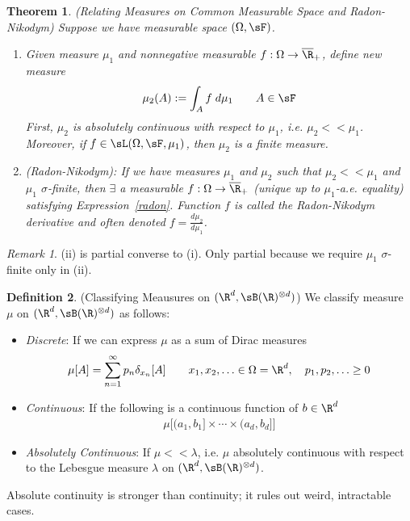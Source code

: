 \documentclass[12pt]{article}
\theoremstyle{plain}
\newtheorem{thm}{Theorem}[section]
\theoremstyle{definition}
\newtheorem{defn}[thm]{Definition}
\theoremstyle{remark}
\newtheorem*{rmk}{Remark}
\newcommand{\ra}{\rightarrow}
\newcommand{\ninf}{_{n=1}^\infty}
\begin{document}
\begin{thm}
\label{thm:radon}
\emph{(Relating Measures on Common Measurable Space and Radon-Nikodym)}
Suppose we have measurable space $(\Omega,\sF)$.
\begin{enumerate}[label=\emph{(\roman*)}]
  \item
    Given measure $\mu_1$ and nonnegative measurable
    $f:\Omega\ra \overline{\R}_+$, define new measure
    \begin{align}
      \mu_2(A) := \int_A f \; d\mu_1
      \qquad A\in\sF
      \label{radon}
    \end{align}
    First, $\mu_2$ is absolutely continuous with respect to
    $\mu_1$, i.e. $\mu_2 << \mu_1$.
    Moreover, if $f\in\sL(\Omega,\sF,\mu_1)$, then $\mu_2$ is a finite
    measure.
  \item \emph{(Radon-Nikodym)}:
    If we have measures $\mu_1$ and $\mu_2$ such that
    $\mu_2<<\mu_1$ and $\mu_1$ $\sigma$-finite,
    then $\exists$ a measurable $f:\Omega\ra \overline{\R}_+$
    (unique up to $\mu_1$-a.e. equality)
    satisfying Expression~\ref{radon}.
    Function $f$ is called the \emph{Radon-Nikodym derivative} and
    often denoted $f=\frac{d\mu_2}{d\mu_1}$.
\end{enumerate}
\end{thm}
\begin{rmk}
(ii) is partial converse to (i).
Only partial because we require $\mu_1$ $\sigma$-finite only in (ii).
\end{rmk}

\begin{defn}
(Classifying Meausures on $(\R^d,\sB(\R)^{\otimes d})$)
We classify measure $\mu$ on $(\R^d,\sB(\R)^{\otimes d})$ as follows:
\begin{itemize}
  \item \emph{Discrete}: If we can express $\mu$ as a sum of Dirac
    measures
    \begin{align*}
      \mu[A] = \sum\ninf p_n \delta_{x_n}[A]
      \qquad x_1,x_2,\ldots\in\Omega=\R^d,
      \quad
      p_1,p_2,\ldots\geq 0
    \end{align*}

  \item \emph{Continuous}: If the following is a continuous function of
    $b\in \R^d$
    \begin{align*}
      \mu\big[
        (a_1,b_1] \times\cdots\times (a_d,b_d]
      \big]
    \end{align*}

  \item \emph{Absolutely Continuous}:
    If $\mu<<\lambda$, i.e. $\mu$ absolutely continuous with respect to
    the Lebesgue measure $\lambda$ on $(\R^d,\sB(\R)^{\otimes d})$.
\end{itemize}
Absolute continuity is stronger than continuity; it rules out weird,
intractable cases.
\end{defn}
\end{document}
